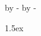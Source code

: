 \topmargin 0pt
\advance \topmargin by -\headheight
\advance \topmargin by -\headsep
\textheight 8.9in
\oddsidemargin 0pt
\evensidemargin \oddsidemargin
\marginparwidth 0.5in
\textwidth 6.5in

\parindent 0in
\parskip 1.5ex


\DeclarePairedDelimiter\ceil{\lceil}{\rceil}
\DeclarePairedDelimiter\floor{\lfloor}{\rfloor}

\newcommand\comment[1]{{\color{red}$\langle$ #1 $\rangle$}}
